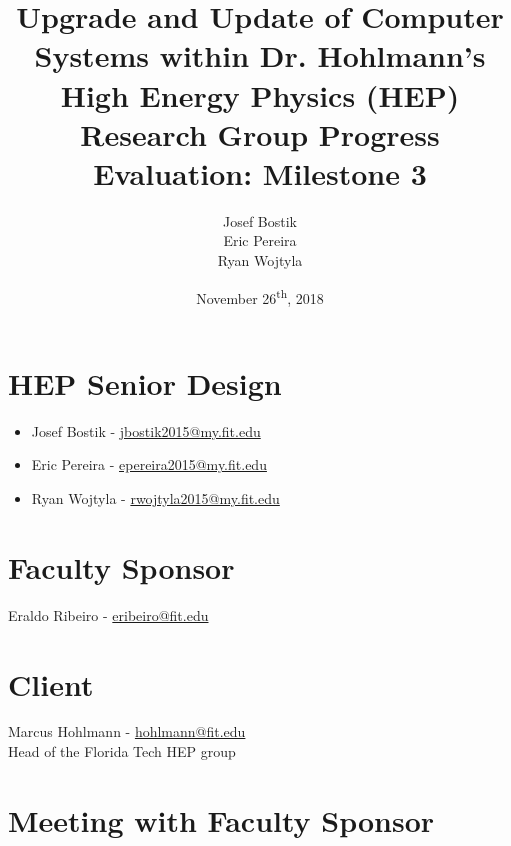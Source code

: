 \documentclass[12pt]{article}
\newcommand\tab[1][1cm]{\hspace*{#1}}
\begin{document}
	

\begin{titlepage}
	
\author{Josef Bostik\\
	Eric Pereira\\
	Ryan Wojtyla\\}
\date{November 26\textsuperscript{th}, 2018}
\title{Upgrade and Update of Computer Systems within Dr. Hohlmann’s High Energy Physics (HEP) Research Group Progress Evaluation: Milestone 3}

\maketitle

\end{titlepage}

\tableofcontents

\newpage {}

\section{HEP Senior Design}

\begin{itemize}
	\item Josef Bostik - \href{mailto:jbostik2015@my.fit.edu}{jbostik2015@my.fit.edu}
	\item Eric Pereira - \href{mailto:epereira2015@my.fit.edu}{epereira2015@my.fit.edu }
	\item Ryan Wojtyla - \href{mailto:rwojtyla2015@my.fit.edu}{rwojtyla2015@my.fit.edu}
\end{itemize}

\section{Faculty Sponsor}

\tab Eraldo Ribeiro - \href{mailto:eribeiro@fit.edu}{eribeiro@fit.edu}

\section{Client}

\tab Marcus Hohlmann - \href{mailto:hohlmann@fit.edu}{hohlmann@fit.edu} \\ 
\tab Head of the Florida Tech HEP group

\section{Meeting with Faculty Sponsor}
\end{document}
